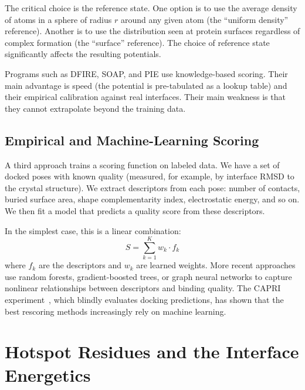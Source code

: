 The critical choice is the reference state.
One option is to use the average density of atoms in a sphere of radius $r$ around any given atom (the ``uniform density'' reference).
Another is to use the distribution seen at protein surfaces regardless of complex formation (the ``surface'' reference).
The choice of reference state significantly affects the resulting potentials.

Programs such as DFIRE, SOAP, and PIE use knowledge-based scoring.
Their main advantage is speed (the potential is pre-tabulated as a lookup table) and their empirical calibration against real interfaces.
Their main weakness is that they cannot extrapolate beyond the training data.

\subsection{Empirical and Machine-Learning Scoring}

A third approach trains a scoring function on labeled data.
We have a set of docked poses with known quality (measured, for example, by interface RMSD to the crystal structure).
We extract descriptors from each pose: number of contacts, buried surface area, shape complementarity index, electrostatic energy, and so on.
We then fit a model that predicts a quality score from these descriptors.

In the simplest case, this is a linear combination:
\begin{equation}
\label{eq:empirical-score}
S = \sum_{k=1}^{K} w_k \cdot f_k
\end{equation}
where $f_k$ are the descriptors and $w_k$ are learned weights.
More recent approaches use random forests, gradient-boosted trees, or graph neural networks to capture nonlinear relationships between descriptors and binding quality.
The CAPRI experiment~\cite{janin2003capri}, which blindly evaluates docking predictions, has shown that the best rescoring methods increasingly rely on machine learning.

\section{Hotspot Residues and the Interface Energetics}
\label{sec:hotspots}

